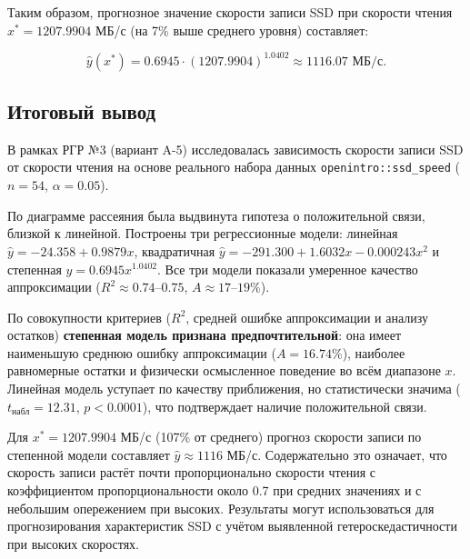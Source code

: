 Таким образом, прогнозное значение скорости записи SSD при скорости чтения \(x^* = 1207.9904\) МБ/с (на 7\% выше среднего уровня) составляет:

\[
\hat{y}(x^*) = 0.6945 \cdot (1207.9904)^{1.0402} \approx 1116.07 \text{ МБ/с}.
\]

\subsection{Итоговый вывод}

В рамках РГР №3 (вариант A-5) исследовалась зависимость скорости записи SSD от скорости чтения на основе реального набора данных \texttt{openintro::ssd\_speed} (\(n = 54\), \(\alpha = 0.05\)).

По диаграмме рассеяния была выдвинута гипотеза о положительной связи, близкой к линейной. Построены три регрессионные модели: линейная \(\hat{y} = -24.358 + 0.9879x\), квадратичная \(\hat{y} = -291.300 + 1.6032x - 0.000243x^2\) и степенная \(\hat{y} = 0.6945x^{1.0402}\). Все три модели показали умеренное качество аппроксимации (\(R^2 \approx 0.74\text{--}0.75\), \(A \approx 17\text{--}19\%\)).

По совокупности критериев (\(R^2\), средней ошибке аппроксимации и анализу остатков) \textbf{степенная модель признана предпочтительной}: она имеет наименьшую среднюю ошибку аппроксимации (\(A = 16.74\%\)), наиболее равномерные остатки и физически осмысленное поведение во всём диапазоне \(x\). Линейная модель уступает по качеству приближения, но статистически значима (\(t_{\text{набл}} = 12.31\), \(p < 0.0001\)), что подтверждает наличие положительной связи.

Для \(x^* = 1207.9904\) МБ/с (107\% от среднего) прогноз скорости записи по степенной модели составляет \(\hat{y} \approx 1116\) МБ/с. Содержательно это означает, что скорость записи растёт почти пропорционально скорости чтения с коэффициентом пропорциональности около 0.7 при средних значениях и с небольшим опережением при высоких. Результаты могут использоваться для прогнозирования характеристик SSD с учётом выявленной гетероскедастичности при высоких скоростях.
